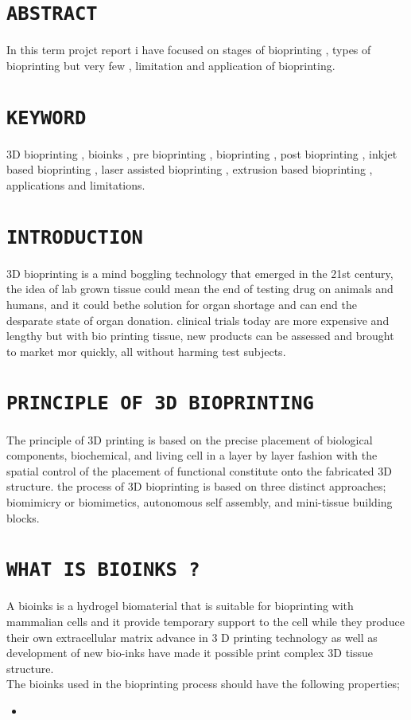 \documentclass[11pt]{article}
\begin{document}
\pagebreak 

\section{\Large\texttt{ABSTRACT}}
In this term projct report i have focused on stages of bioprinting , types of bioprinting but very few , limitation and application of bioprinting.

\section{\Large\texttt{KEYWORD}}
3D bioprinting , bioinks , pre bioprinting , bioprinting , post bioprinting , inkjet based bioprinting , laser assisted bioprinting , extrusion based bioprinting , applications and limitations.

\section{\Large\texttt{INTRODUCTION}}
3D bioprinting is a mind boggling technology that emerged in the 21st century, the idea of lab grown tissue could mean the end of testing drug on animals and humans, and it could bethe solution for organ shortage and can end the desparate state of organ donation.
clinical trials today are more expensive and lengthy but with bio printing tissue, new products can be assessed and brought to market mor quickly, all without harming test subjects.
\section{\Large\texttt{PRINCIPLE OF 3D BIOPRINTING}}
The principle of 3D printing is based on the precise placement of biological components, biochemical, and living cell in a layer by layer fashion with the spatial control of the placement of functional constitute onto the fabricated 3D structure. the process of 3D bioprinting is based on three distinct approaches; biomimicry or biomimetics, autonomous self assembly, and mini-tissue building blocks. 
\section{\Large\texttt{WHAT IS BIOINKS ?}}
A bioinks is a hydrogel biomaterial that is suitable for bioprinting with mammalian cells and it provide temporary support to the cell while they produce their own extracellular matrix advance in 3 D printing technology as well as development of new bio-inks have made it possible print complex 3D tissue structure.\\
The bioinks used in the bioprinting process should have the following properties;\\
\begin{itemize}
\item 
\end{itemize}
 
\end{document}
